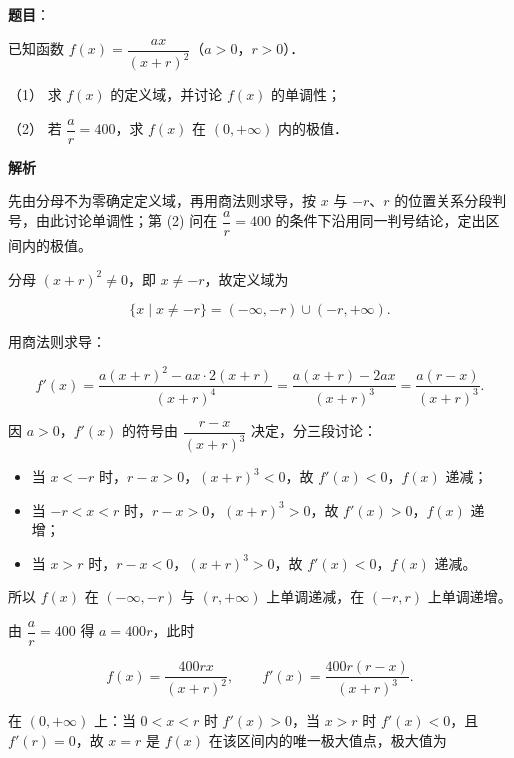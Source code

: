 \begin{answer}

\textbf{题目}：

已知函数 \(f(x)=\dfrac{ax}{(x+r)^2}\)（\(a>0\)，\(r>0\)）．

（1） 求 \(f(x)\) 的定义域，并讨论 \(f(x)\) 的单调性；

（2） 若 \(\dfrac{a}{r}=400\)，求 \(f(x)\) 在 \((0,+\infty)\) 内的极值．

\textbf{解析}

先由分母不为零确定定义域，再用商法则求导，按 \(x\) 与 \(-r\)、\(r\) 的位置关系分段判号，由此讨论单调性；第 (2) 问在 \(\dfrac{a}{r}=400\) 的条件下沿用同一判号结论，定出区间内的极值。


分母 \((x+r)^2\neq0\)，即 \(x\neq-r\)，故定义域为

\nopagebreak[4]
\[
\{x\mid x\neq-r\}=(-\infty,-r)\cup(-r,+\infty).
\]

用商法则求导：

\nopagebreak[4]
\[
f'(x)=\dfrac{a(x+r)^2-ax\cdot2(x+r)}{(x+r)^4}=\dfrac{a(x+r)-2ax}{(x+r)^3}=\dfrac{a(r-x)}{(x+r)^3}.
\]

因 \(a>0\)，\(f'(x)\) 的符号由 \(\dfrac{r-x}{(x+r)^3}\) 决定，分三段讨论：

\begin{itemize}
\item 当 \(x<-r\) 时，\(r-x>0\)，\((x+r)^3<0\)，故 \(f'(x)<0\)，\(f(x)\) 递减；
\item 当 \(-r<x<r\) 时，\(r-x>0\)，\((x+r)^3>0\)，故 \(f'(x)>0\)，\(f(x)\) 递增；
\item 当 \(x>r\) 时，\(r-x<0\)，\((x+r)^3>0\)，故 \(f'(x)<0\)，\(f(x)\) 递减。
\end{itemize}

所以 \(f(x)\) 在 \((-\infty,-r)\) 与 \((r,+\infty)\) 上单调递减，在 \((-r,r)\) 上单调递增。


由 \(\dfrac{a}{r}=400\) 得 \(a=400r\)，此时

\nopagebreak[4]
\[
f(x)=\dfrac{400rx}{(x+r)^2},\qquad f'(x)=\dfrac{400r(r-x)}{(x+r)^3}.
\]

在 \((0,+\infty)\) 上：当 \(0<x<r\) 时 \(f'(x)>0\)，当 \(x>r\) 时 \(f'(x)<0\)，且 \(f'(r)=0\)，故 \(x=r\) 是 \(f(x)\) 在该区间内的唯一极大值点，极大值为


\end{answer}
